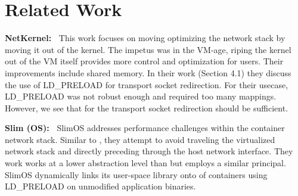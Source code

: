 \section{Related Work}
\textbf{NetKernel:~\cite{netkernel}}
This work focuses on moving optimizing the network stack by moving it out of the kernel.
The impetus was in the VM-age, riping the kernel out of the VM itself provides more control and optimization for users.
Their improvements include shared memory.
In their work (Section 4.1) they discuss the use of LD\_PRELOAD for transport socket redirection.
For their usecase, LD\_PRELOAD was not robust enough and required too many mappings.
However, we see that for \sysname the transport socket redirection should be sufficient.


\textbf{Slim (OS):~\cite{slimos}}
SlimOS addresses performance challenges within the container network stack.
Similar to \sysname, they attempt to avoid traveling the virtualized network stack and directly preceding through the host network interface.
They work works at a lower abstraction level than \sysname but employs a similar principal.
SlimOS dynamically links its user-space library onto of containers using LD\_PRELOAD on unmodified application binaries.
